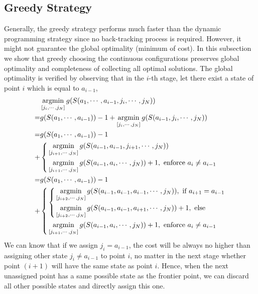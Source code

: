 \documentclass[letterpaper, 10 pt, conference]{ieeeconf}  %
\begin{document}
\subsection{Greedy Strategy}\label{section:greedy}
Generally, the greedy strategy performs much faster than the dynamic programming strategy since no back-tracking process is required. However, it might not guarantee the global optimality (minimum of cost). 
In this subsection we show that greedy choosing the continuous configurations preserves global optimality and completeness of collecting all optimal solutions. 
The global optimality is verified by observing that in the $i$-th stage, let there exist a state of point $i$ which is equal to $a_{i-1}$, 
\begin{equation}\label{equ:optimality}
\begin{aligned}
&\mathop{\rm argmin}\limits_{[j_i, \cdots, j_N]} g(S(a_1, \cdots, a_{i-1}, j_i, \cdots, j_N))\\
=&g(S(a_1, \cdots, a_{i-1})) - 1 + \mathop{\rm argmin}\limits_{[j_i, \cdots, j_N]} g(S(a_{i-1}, j_i, \cdots, j_N))\\
=&g(S(a_1, \cdots, a_{i-1})) - 1 \\
+& \left\{
\begin{aligned}
&\mathop{\rm argmin}\limits_{[j_{i+1}, \cdots, j_N]} g(S(a_{i-1}, a_{i-1}, j_{i+1}, \cdots, j_N))\\
&\mathop{\rm argmin}\limits_{[j_{i+1}, \cdots, j_N]} g(S(a_{i-1}, a_i, \cdots, j_N))+1, \mbox{ enforce }a_i\neq a_{i-1}
\end{aligned}\right.\\
=&g(S(a_1, \cdots, a_{i-1})) - 1 \\
+&\left\{
\begin{aligned}
	&\left\{
	\begin{aligned}
		&\mathop{\rm argmin}\limits_{[j_{i+2}, \cdots, j_N]} g(S(a_{i-1}, a_{i-1}, a_{i-1}, \cdots, j_N)), \mbox{ if } a_{i+1}=a_{i-1}\\
		&\mathop{\rm argmin}\limits_{[j_{i+2}, \cdots, j_N]} g(S(a_{i-1}, a_{i-1}, a_{i+1}, \cdots, j_N))+1, \mbox{ else }
	\end{aligned}
	\right.\\
	&\mathop{\rm argmin}\limits_{[j_{i+1}, \cdots, j_N]} g(S(a_{i-1}, a_i, \cdots, j_N))+1, \mbox{ enforce }a_i\neq a_{i-1}
\end{aligned}
\right.
\end{aligned}
\end{equation}
We can know that if we assign $j_i = a_{i-1}$, the cost will be always no higher than assigning other state $j_i\neq a_{i-1}$ to point $i$, no matter in the next stage whether point $(i+1)$ will have the same state as point $i$. 
Hence, when the next unassigned point has a same possible state as the frontier point, we can discard all other possible states and directly assign this one. 
\end{document}
